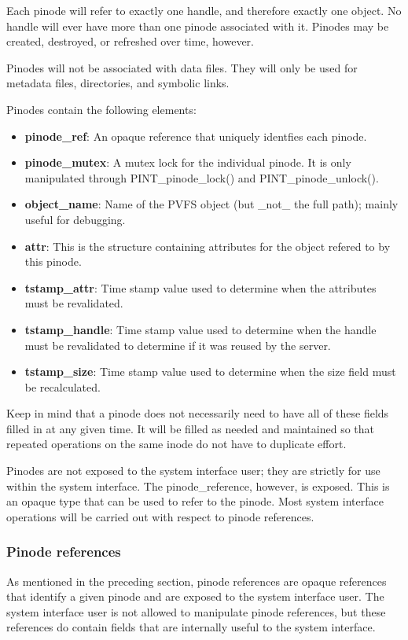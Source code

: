 \documentclass[11pt, letterpaper]{article}
\begin{document}
Each pinode will refer to exactly one handle, and therefore exactly one
object.  No handle will ever have more than one pinode associated with
it.  Pinodes may be created, destroyed, or refreshed over time, however.

Pinodes will not be associated with data files.  They will only be used
for metadata files, directories, and symbolic links.  

Pinodes contain the following elements:
\begin{itemize}
\item \textbf{pinode\_ref}: An opaque reference that uniquely
identfies each pinode.
\item \textbf{pinode\_mutex}: A mutex lock for the individual pinode.
It is only manipulated through PINT\_pinode\_lock() and
PINT\_pinode\_unlock().
\item \textbf{object\_name}: Name of the PVFS object (but \_not\_
the full path); mainly useful for debugging.
\item \textbf{attr}:  This is the structure containing
attributes for the object refered to by this pinode.  
\item \textbf{tstamp\_attr}:  Time stamp value used to determine
when the attributes must be revalidated.
\item \textbf{tstamp\_handle}:  Time stamp value used to determine
when the handle must be revalidated to determine if it was reused
by the server.
\item \textbf{tstamp\_size}:  Time stamp value used to determine
when the size field must be recalculated.
\end{itemize}

Keep in mind that a pinode does not necessarily need to have all of
these fields filled in at any given time.  It will be filled as needed
and maintained so that repeated operations on the same inode do not have
to duplicate effort.

Pinodes are not exposed to the system interface user; they are
strictly for use within the system interface.  The
pinode\_reference, however, is exposed.  This is an opaque type
that can be used to refer to the pinode.  Most system interface
operations will be carried out with respect to pinode references.

\subsubsection{Pinode references}

As mentioned in the preceding section, pinode references are opaque
references that identify a given pinode and are exposed to the
system interface user.  The system interface user is
not allowed to manipulate pinode references, but these references
do contain fields that are internally useful to the system interface.
\end{document}
